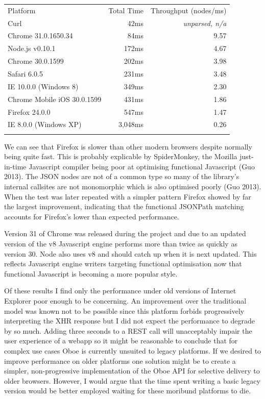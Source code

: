 \documentclass[12pt, ]{article}
\begin{document}
\begin{longtable}[c]{@{}lrr@{}}
\hline\noalign{\medskip}
Platform & Total Time & Throughput (nodes/ms)
\\\noalign{\medskip}
\hline\noalign{\medskip}
Curl & 42ms & \emph{unparsed, n/a}
\\\noalign{\medskip}
Chrome 31.0.1650.34 & 84ms & 9.57
\\\noalign{\medskip}
Node.js v0.10.1 & 172ms & 4.67
\\\noalign{\medskip}
Chrome 30.0.1599 & 202ms & 3.98
\\\noalign{\medskip}
Safari 6.0.5 & 231ms & 3.48
\\\noalign{\medskip}
IE 10.0.0 (Windows 8) & 349ms & 2.30
\\\noalign{\medskip}
Chrome Mobile iOS 30.0.1599 & 431ms & 1.86
\\\noalign{\medskip}
Firefox 24.0.0 & 547ms & 1.47
\\\noalign{\medskip}
IE 8.0.0 (Windows XP) & 3,048ms & 0.26
\\\noalign{\medskip}
\hline
\end{longtable}

We can see that Firefox is slower than other modern browsers despite
normally being quite fast. This is probably explicable by SpiderMonkey,
the Mozilla just-in-time Javascript compiler being poor at optimising
functional Javascript (Guo 2013). The JSON nodes are not of a common
type so many of the library's internal callsites are not monomorphic
which is also optimised poorly (Guo 2013). When the test was later
repeated with a simpler pattern Firefox showed by far the largest
improvement, indicating that the functional JSONPath matching accounts
for Firefox's lower than expected performance.

Version 31 of Chrome was released during the project and due to an
updated version of the v8 Javascript engine performs more than twice as
quickly as version 30. Node also uses v8 and should catch up when it is
next updated. This reflects Javascript engine writers targeting
functional optimisation now that functional Javascript is becoming a
more popular style.

Of these results I find only the performance under old versions of
Internet Explorer poor enough to be concerning. An improvement over the
traditional model was known not to be possible since this platform
forbids progressively interpreting the XHR response but I did not expect
the performance to degrade by so much. Adding three seconds to a REST
call will unacceptably impair the user experience of a webapp so it
might be reasonable to conclude that for complex use cases Oboe is
currently unsuited to legacy platforms. If we desired to improve
performance on older platforms one solution might be to create a
simpler, non-progressive implementation of the Oboe API for selective
delivery to older browsers. However, I would argue that the time spent
writing a basic legacy version would be better employed waiting for
these moribund platforms to die.
\end{document}

